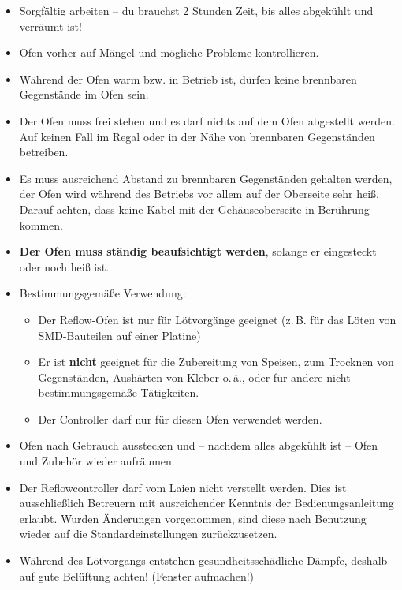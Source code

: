 \documentclass{\basedir/fablab-document}
\begin{document}
\begin{itemize}
	\item Sorgfältig arbeiten -- du brauchst 2 Stunden Zeit, bis alles abgekühlt und verräumt ist! 
	\item Ofen vorher auf Mängel und mögliche Probleme kontrollieren.
	\item Während der Ofen warm bzw. in Betrieb ist, dürfen keine brennbaren Gegenstände im Ofen sein. 
	\item Der Ofen muss frei stehen und es darf nichts auf dem Ofen abgestellt werden. Auf keinen Fall im Regal oder in der Nähe von brennbaren Gegenständen betreiben.
\item Es muss ausreichend Abstand zu brennbaren Gegenständen gehalten werden, der Ofen wird während des Betriebs vor allem auf der Oberseite sehr heiß. Darauf achten, dass keine Kabel mit der Gehäuseoberseite in Berührung kommen.
	\item \textbf{Der Ofen muss ständig beaufsichtigt werden}, solange er eingesteckt oder noch heiß ist.
\item Bestimmungsgemäße Verwendung:
\begin{itemize}
\item Der Reflow-Ofen ist nur für Lötvorgänge geeignet (z.\,B. für das Löten von SMD-Bauteilen auf einer Platine)
\item Er ist \textbf{nicht} geeignet für die Zubereitung von Speisen, zum Trocknen von Gegenständen, Aushärten von Kleber o.\,ä., oder für andere nicht bestimmungsgemäße Tätigkeiten.
\item Der Controller darf nur für diesen Ofen verwendet werden.
\end{itemize}
	\item Ofen nach Gebrauch ausstecken und -- nachdem alles abgekühlt ist -- Ofen und Zubehör wieder aufräumen.
	\item Der Reflowcontroller darf vom Laien nicht verstellt werden. Dies ist ausschließlich Betreuern mit ausreichender Kenntnis der Bedienungsanleitung erlaubt. Wurden Änderungen vorgenommen, sind diese nach Benutzung wieder auf die Standardeinstellungen zurückzusetzen.
\item Während des Lötvorgangs entstehen gesundheitsschädliche Dämpfe, deshalb auf gute Belüftung achten! (Fenster aufmachen!)
\end{itemize}
\end{document}
